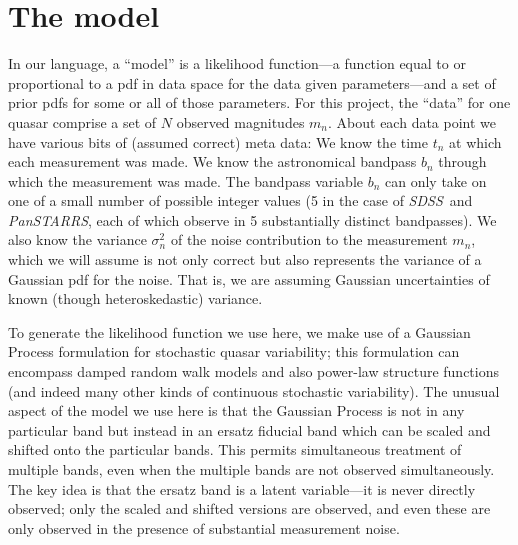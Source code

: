 \documentclass[letterpaper,12pt]{article}
\newcommand{\project}[1]{\textsl{#1}}
\newcommand{\sdss}{\project{SDSS}}
\newcommand{\panstarrs}{\project{PanSTARRS}}
\begin{document}
\section{The model}

In our language, a ``model'' is a likelihood function---a function
equal to or proportional to a pdf in data space for the data given
parameters---and a set of prior pdfs for some or all of those
parameters.  For this project, the ``data'' for one quasar comprise a
set of $N$ observed magnitudes $m_n$.  About each data point we have
various bits of (assumed correct) meta data: We know the time $t_n$ at
which each measurement was made.  We know the astronomical bandpass
$b_n$ through which the measurement was made.  The bandpass variable
$b_n$ can only take on one of a small number of possible integer
values (5 in the case of \sdss\ and \panstarrs, each of which observe
in 5 substantially distinct bandpasses).  We also know the variance
$\sigma_n^2$ of the noise contribution to the measurement $m_n$, which
we will assume is not only correct but also represents the variance of
a Gaussian pdf for the noise.  That is, we are assuming Gaussian
uncertainties of known (though heteroskedastic) variance.

To generate the likelihood function we use here, we make
use of a Gaussian Process formulation for stochastic quasar
variability; this formulation can encompass damped random walk models
and also power-law structure functions (and indeed many other kinds of
continuous stochastic variability).  The unusual aspect of the model
we use here is that the Gaussian Process is not in any particular band
but instead in an ersatz fiducial band which can be scaled and shifted
onto the particular bands.  This permits simultaneous treatment of
multiple bands, even when the multiple bands are not observed
simultaneously.  The key idea is that the ersatz band is a latent
variable---it is never directly observed; only the scaled and shifted
versions are observed, and even these are only observed in the
presence of substantial measurement noise.
\end{document}

